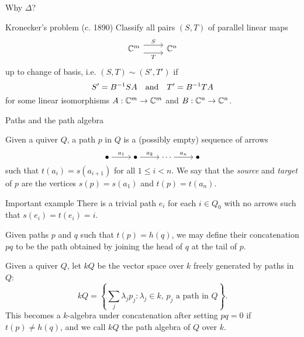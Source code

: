 \documentclass[
  xcolor=dvipsnames,
  aspectratio=169,
  compress
]{beamer}
\begin{document}
\begin{frame}[fragile]{Why $\Delta$?}
  \begin{block}{Kronecker's problem (c. 1890)}
    Classify all pairs $(S, T)$ of parallel linear maps
    \[
      \begin{tikzcd}
        {\bb{C}^m} & {\bb{C}^n}
        \arrow["S", shift left=2, from=1-1, to=1-2]
        \arrow["T"', shift right=2, from=1-1, to=1-2]
      \end{tikzcd}
    \]
    up to \alert{change of basis},
    i.e. $(S, T) \sim (S', T')$ if
    \[
      S' = B^{-1} S A
      \quad \text{and} \quad
      T' = B^{-1} T A
    \]
    for some linear isomorphisms $A: \mathbb{C}^m \to \mathbb{C}^m$ and $B: \mathbb{C}^n \to \mathbb{C}^n$.
  \end{block}
\end{frame}

\begin{frame}[fragile]{Paths and the path algebra}
  \begin{definition}
    Given a quiver $Q$, a \alert{path} $p$ in $Q$ is a (possibly empty) sequence of arrows
    \[
      \begin{tikzcd}[cramped]
        \bullet & \bullet & \cdots & \bullet
        \arrow["{a_1}", from=1-1, to=1-2]
        \arrow["{a_2}", from=1-2, to=1-3]
        \arrow["{a_n}", from=1-3, to=1-4]
      \end{tikzcd}
    \]
    such that $t(a_i) = s(a_{i + 1})$ for all $1 \leq i < n$.
    We say that the \emph{source} and \emph{target} of $p$ are the vertices $s(p) = s(a_1)$ and $t(p) = t(a_n)$.
  \end{definition}

  \pause

  \begin{exampleblock}{Important example}
    There is a \alert{trivial path} $e_i$ for each $i \in Q_0$ with no arrows such that $s(e_i) = t(e_i) = i$.
  \end{exampleblock}
\end{frame}

\begin{frame}
  \begin{definition}
    Given paths $p$ and $q$ such that $t(p) = h(q)$, we may define their \alert{concatenation} $pq$ to be the path obtained by joining the head of $q$ at the tail of $p$.
  \end{definition}

  \pause

  \begin{definition}
    Given a quiver $Q$, let $kQ$ be the vector space over $k$ freely generated by paths in $Q$:
    \[
      kQ = \left\{
        \sum_j \lambda_j p_j: \lambda_j \in k, \, p_j \text{ a path in } Q
      \right\}.
    \]
    This becomes a $k$-algebra under concatenation after setting $pq = 0$ if $t(p) \neq h(q)$, and we call $kQ$ the \alert{path algebra} of $Q$ over $k$.
  \end{definition}
\end{frame}
\end{document}
